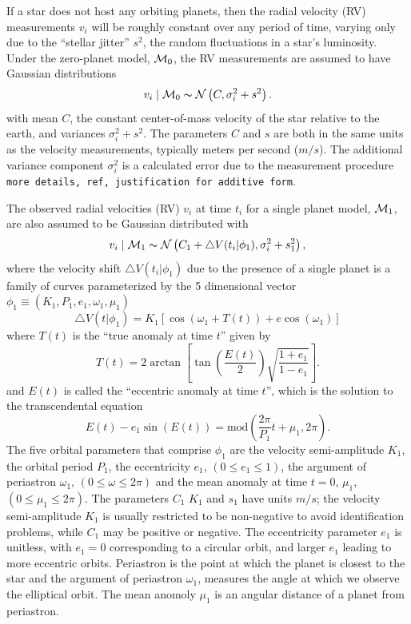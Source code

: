 \documentclass[aoas]{imsart}
\def\M{{\cal{M}}}
\def\ind{\thicksim}
\begin{document}
If a star does not host any orbiting planets, then the radial velocity
(RV) measurements $v_i$ will be roughly constant over any period of time,
varying only due to the ``stellar jitter'' $s^2$, the random
fluctuations in a star's luminosity. Under the zero-planet
model, $\M_0$, the RV measurements are assumed to  have Gaussian distributions
\begin{equation}\label{0p_Model}
v_i \mid \M_0\ind \mathcal{N}\left(C,\sigma_i^2+s^2\right).
\end{equation}
with mean $C$, the constant center-of-mass velocity of the star
relative to the earth, and variances $\sigma^2_i + s^2$.  The
parameters $C$ and $s$ are both in the same units as the velocity
measurements, typically meters per second ($m/s$).  The additional
variance component $\sigma^2_i$ is a calculated error due to the
measurement procedure {\tt more
  details, ref, justification for additive form}.


The observed radial velocities (RV) $v_i$ at time $t_i$
for a single planet model, $\M_1$, are also assumed to be Gaussian
distributed  with
\begin{equation}\label{Velocity_Model}
v_i \mid \M_1 \ind \mathcal{N}\left(C_1 +\bigtriangleup
V(t_i|\phi_1),\sigma_i^2+s_1^2\right),
\end{equation}
where the velocity shift $\bigtriangleup
V(t_i|\phi_1)$ due to the presence of a single planet is
a  family of curves parameterized by the 5 dimensional vector
$\phi_1 \equiv (K_1,P_1,e_1,\omega_1,\mu_1)$
\begin{equation}\label{Velocity_1p_Model}
\bigtriangleup V(t|\phi_1)=K_1[\cos(\omega_1+T(t))+e\cos(\omega_1)]
\end{equation}
where $T(t)$ is the ``true anomaly at time $t$'' given by
\begin{equation}\label{true_anomaly}
T(t)=2\arctan\left[\tan(\frac{E(t)}{2})\sqrt{\frac{1+e_1}{1-e_1}}\right].
\end{equation}
and $E(t)$ is called the ``eccentric anomaly at time $t$'', which is the
solution to the transcendental equation
\begin{equation}\label{transcendental_equation}
E(t)-e_1\sin(E(t))=\mbox{mod}\left(\frac{2\pi}{P_1}t+\mu_1,2\pi\right).
\end{equation}
The five orbital parameters that comprise $\phi_1$ are the velocity
semi-amplitude $K_1$, the orbital period $P_1$, the eccentricity $e_1$,
$(0\leq e_1 \le 1)$, the argument of periastron $\omega_1$, $(0\le \omega
\le 2\pi)$ and the mean anomaly at time $t=0$, $\mu_1$, $(0\le \mu_1
\le 2\pi)$.  The parameters $C_1$ $K_1$ and $s_1$ have units $m/s$;
the velocity semi-amplitude $K_1$ is usually restricted to be
non-negative to avoid identification problems, while $C_1$ may be
positive or negative.  The eccentricity parameter $e_1$ is unitless,
with $e_1 = 0$ corresponding to a circular orbit, and larger $e_1$ leading
to more eccentric orbits. Periastron is the point at which the planet
is closest to the star and the argument of periastron $\omega_1$, measures
the angle at which we observe the elliptical orbit.  The mean anomoly $\mu_1$ is
an angular distance of a planet from periastron. 
\end{document}
